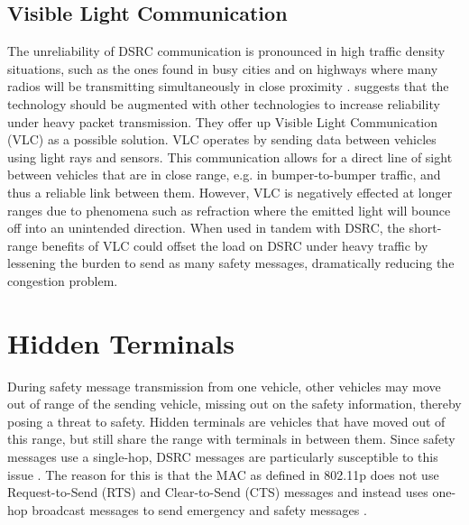 \documentclass[twoside,conference]{IEEEtran}
\begin{document}
	\begin{comment}
	\subsection{Distributed Congestion Control}\label{sec:distributedcongestion}
		Uhlemann talks about distributed congestion control and that ETSI proposes this in ITS-G5\cite{Uhlemann2015}.  ETSI PHY and MAC layer document \cite{ETSI-ES202663} points to ETSI Technical Specification for Decentralized Congestion Control document (ETSI TS 102 687) for this\cite{ETSI-TS102687}.  Aygun et. al propose a transmit power control and rate control, specifically ECPR (Environment and Context Aware Combined Power and Rate) Distributed Congestion Control for Vehicular Communications\cite{Aygun2015}.
	\end{comment}
		
	\subsection{Visible Light Communication}\label{sec:visiblelightcommunication}
		The unreliability of DSRC communication is pronounced in high traffic density situations, such as the ones found in busy cities and on highways where many radios will be transmitting simultaneously in close proximity \cite{Cailean2014}. \cite{Cailean2014} suggests that the technology should be augmented with other technologies to increase reliability under heavy packet transmission. They offer up Visible Light Communication (VLC) as a possible solution. VLC operates by sending data between vehicles using light rays and sensors. This communication allows for a direct line of sight between vehicles that are in close range, e.g. in bumper-to-bumper traffic, and thus a reliable link between them. However, VLC is negatively effected at longer ranges due to phenomena such as refraction where the emitted light will bounce off into an unintended direction. When used in tandem with DSRC, the short-range benefits of VLC could offset the load on DSRC under heavy traffic by lessening the burden to send as many safety messages, dramatically reducing the congestion problem.

\section{Hidden Terminals}\label{sec:hiddenterminal}
		During safety message transmission from one vehicle, other vehicles may move out of range of the sending vehicle, missing out on the safety information, thereby posing a threat to safety. Hidden terminals are vehicles that have moved out of this range, but still share the range with terminals in between them. Since safety messages use a single-hop, DSRC messages are particularly susceptible to this issue \cite{Ma2009}.  The reason for this is that the MAC as defined in 802.11p does not use Request-to-Send (RTS) and Clear-to-Send (CTS) messages and instead uses one-hop broadcast messages to send emergency and safety messages \cite[p. 969]{Rahman2014}. 
		
\end{document}
